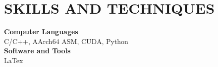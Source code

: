 \section*{SKILLS AND TECHNIQUES}

\noindent
\textbf{Computer Languages} \\
C/C++, AArch64 ASM, CUDA, Python\\

\noindent
\textbf{Software and Tools} \\
LaTex
